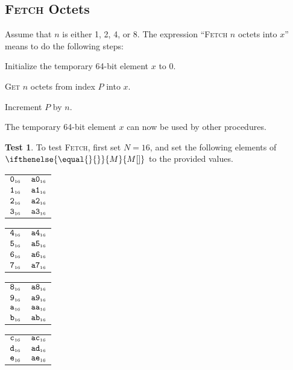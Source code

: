 \documentclass[a4paper,12pt]{article}
\makeatletter
\newcommand{\num}[1]{\texttt{\MakeLowercase{#1}}}
\newcommand{\hex}[1]{\num{#1}_{\textup{\tiny 16}}}
\newcommand{\MEM}[1]{\ifthenelse{\equal{#1}{}}{M}{M[#1]}}
\newcommand{\PC}{P}
\newcommand{\proc}[1]{\textsc{#1}}
\theoremstyle{definition}
\newtheorem{test}{Test}
\newenvironment{memtable}{%
  \begin{trivlist}
    \item
    }{%
    \end{trivlist}}
\newenvironment{memcolumn}{%
  \begin{tabular}{@{}ll@{}}
    \hline}
    {%
    \hline
  \end{tabular}}
\newcommand{\memspace}{\qquad}
\makeatother
\begin{document}
\subsection{\proc{Fetch} Octets}

Assume that $n$ is either 1, 2, 4, or 8.
The expression ``\proc{Fetch} $n$ octets into $x$'' means to do the following steps:
\begin{stepnumbers}
\item Initialize the temporary 64-bit element $x$ to 0.
\item \proc{Get} $n$ octets from index $\PC$ into $x$.
\item Increment $\PC$ by $n$.
\end{stepnumbers}
The temporary 64-bit element $x$ can now be used by other procedures.

\begin{test}
  To test \proc{Fetch}, first set $N=16$, and set the following elements of $\MEM{}$ to the provided values.
  \begin{memtable}
    \begin{memcolumn}
      $\hex{0}$ & $\hex{A0}$ \\
      $\hex{1}$ & $\hex{A1}$ \\
      $\hex{2}$ & $\hex{A2}$ \\
      $\hex{3}$ & $\hex{A3}$ \\
    \end{memcolumn}
    \memspace
    \begin{memcolumn}
      $\hex{4}$ & $\hex{A4}$ \\
      $\hex{5}$ & $\hex{A5}$ \\
      $\hex{6}$ & $\hex{A6}$ \\
      $\hex{7}$ & $\hex{A7}$ \\
    \end{memcolumn}
    \memspace
    \begin{memcolumn}
      $\hex{8}$ & $\hex{A8}$ \\
      $\hex{9}$ & $\hex{A9}$ \\
      $\hex{A}$ & $\hex{AA}$ \\
      $\hex{B}$ & $\hex{AB}$ \\
    \end{memcolumn}
    \memspace
    \begin{memcolumn}
      $\hex{C}$ & $\hex{AC}$ \\
      $\hex{D}$ & $\hex{AD}$ \\
      $\hex{E}$ & $\hex{AE}$ \\

\end{memcolumn}
\end{memtable}
\end{test}
\end{document}
